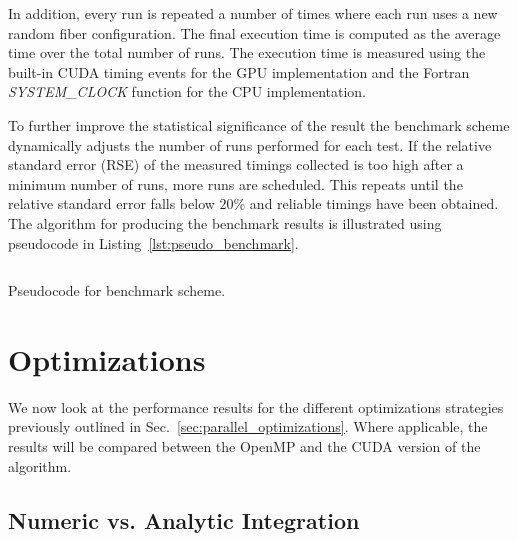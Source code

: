 In addition, every run is repeated a number of times where each run uses a new random fiber configuration. The final execution time is computed as the average time over the total number of runs. The execution time is measured using the built-in CUDA timing events for the GPU implementation and the Fortran \emph{SYSTEM\_CLOCK} function for the CPU implementation.

To further improve the statistical significance of the result the benchmark scheme dynamically adjusts the number of runs performed for each test. If the relative standard error (RSE) of the measured timings collected is too high after a minimum number of runs, more runs are scheduled. This repeats until the relative standard error falls below $20\%$ and reliable timings have been obtained.  The algorithm for producing the benchmark results is illustrated using pseudocode in Listing~\ref{lst:pseudo_benchmark}. 

\begin{listing}[!htbp]
  \centering
  \inputminted[mathescape,
    linenos,
    numbersep=5pt,
    fontsize=\footnotesize,
    frame=lines,
    framesep=2mm]{c}{lst/benchmark_scheme.lst}
  \caption{Pseudocode for benchmark scheme.}
  \label{lst:pseudo_benchmark}
\end{listing}

\section{Optimizations}
\label{sec:bench_optimization}

We now look at the performance results for the different optimizations strategies previously outlined in Sec.~\ref{sec:parallel_optimizations}. Where applicable, the results will be compared between the OpenMP and the CUDA version of the algorithm.

\subsection{Numeric vs. Analytic Integration}
\label{subsec:bench_numeric_vs_analytic}


